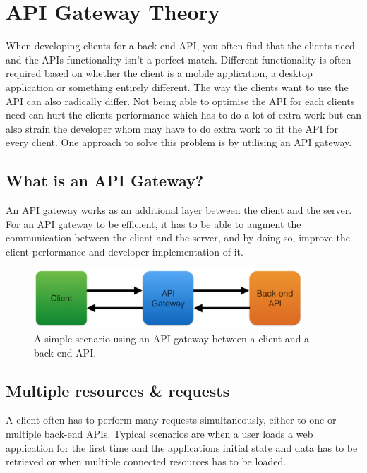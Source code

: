 \documentclass{cslthse-msc}
\begin{document}
\chapter{API Gateway Theory}
When developing clients for a back-end API, you often find that the clients need and the APIs functionality isn't a perfect match. Different functionality is often required based on whether the client is a mobile application, a desktop application or something entirely different. The way the clients want to use the API can also radically differ. Not being able to optimise the API for each clients need can hurt the clients performance which has to do a lot of extra work but can also strain the developer whom may have to do extra work to fit the API for every client. One approach to solve this problem is by utilising an API gateway.

\section{What is an API Gateway?}
An API gateway works as an additional layer between the client and the server. For an API gateway to be efficient, it has to be able to augment the communication between the client and the server, and by doing so, improve the client performance and developer implementation of it.

\begin{figure}[H]
  \centering
    \begin{center}
      \includegraphics[width=0.9\textwidth]{images/api_gateway.png}
    \end{center}
  \caption{A simple scenario using an API gateway between a client and a back-end API.}
\end{figure}

\section{Multiple resources \& requests}
A client often has to perform many requests simultaneously, either to one or multiple back-end APIs. Typical scenarios are when a user loads a web application for the first time and the applications initial state and data has to be retrieved or when multiple connected resources has to be loaded.
\end{document}
